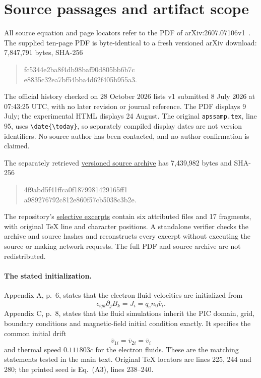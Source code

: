 \section{Source passages and artifact scope}
\label{app:source-evidence}

All source equation and page locators refer to the PDF of
arXiv:2607.07106v1~\cite{original}. The supplied ten-page PDF is byte-identical
to a fresh versioned arXiv download: 7,847,791 bytes, SHA-256
\begin{quote}\footnotesize\ttfamily
fc5344e2ba8f4db98baf90d805bb6b7c\\
e8835c32ea7bf54bba4d62f405b955a3.
\end{quote}
The official history checked on 28 October 2026 lists v1 submitted
8 July 2026 at 07:43:25 UTC, with no later revision or journal reference.
The PDF displays 9 July; the experimental HTML displays 24 August. The original
\texttt{apssamp.tex}, line 95, uses \verb|\date{\today}|, so separately compiled
display dates are not version identifiers. No source author has been contacted,
and no author confirmation is claimed.

The separately retrieved
\href{https://arxiv.org/src/2607.07106v1}{versioned source archive} has
7,439,982 bytes and SHA-256
\begin{quote}\footnotesize\ttfamily
4f9abd5f41ffca0f1879981429165ff1\\
a989276792c812e860f57cb5038c3b2e.
\end{quote}
The repository's
\href{https://github.com/Teylersf/counterstreaming-heatflux-audit/tree/main/source-excerpts}{selective excerpts}
contain six attributed files and 17 fragments, with original TeX line and
character positions. A standalone verifier checks the archive and source
hashes and reconstructs every excerpt without executing the source or making
network requests. The full PDF and source archive are not redistributed.

\paragraph{The stated initialization.}
Appendix A, p.~6, states that the electron fluid velocities are initialized from
\[
 \epsilon_{ijk}\partial_j B_k=J_i=q_e n_0\overline v_i.
\]
Appendix C, p.~8, states that the fluid simulations inherit the PIC domain,
grid, boundary conditions and magnetic-field initial condition exactly. It
specifies the common initial drift
\[
 \overline v_{1i}=\overline v_{2i}=\overline v_i
\]
and thermal speed $0.111803c$ for the electron fluids. These are the
matching statements tested in the main text. Original TeX locators are
lines 225, 244 and 280; the printed seed is Eq.~(A3), lines 238--240.

